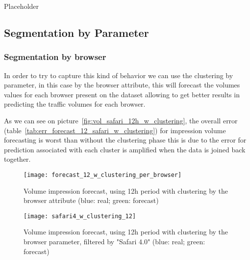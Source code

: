 Placeholder


\subsection*{Segmentation by Parameter}

\subsubsection*{Segmentation by browser}

In order to try to capture this kind of behavior we can use the clustering by
parameter, in this case by the browser attribute, this will forecast the volumes
values for each browser present on the dataset allowing to get better results in
predicting the traffic volumes for each browser.

As we can see on picture~\ref{fig:vol_safari_12h_w_clustering}, the overall error
(table~\ref{tab:err_forecast_12_safari_w_clustering}) for impression volume
forecasting is worst than without the clustering phase this is due to the error
for prediction associated with each cluster is amplified when the data is joined
back together.

\begin{figure}[!ht]
\centering
\begin{minipage}[b]{0.45\linewidth}
\texttt{[image: forecast\_12\_w\_clustering\_per\_browser]} \caption[Volume
impression forecast, safari 4]{Volume impression
forecast, using 12h period with clustering by the browser attribute (blue: real; green: forecast)}
\label{fig:vol_safari_12h_w_clustering}
\end{minipage}
\quad
\begin{minipage}[b]{0.45\linewidth}
\texttt{[image: safari4\_w\_clustering\_12]} \caption[Volume
impression forecast, safari 4]{Volume impression
forecast, using 12h period with clustering by the browser parameter, filtered by "Safari 4.0" (blue: real; green: forecast)}
\label{fig:vol_safari_12h_w_clustering_safari_4}
\end{minipage}

\end{figure}

